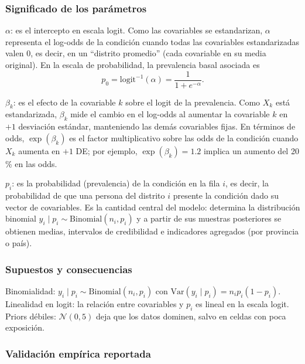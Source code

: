 \documentclass[
]{article}
\begin{document}
\subsubsection{Significado de los
parámetros}\label{significado-de-los-paruxe1metros}

\(\alpha\): es el intercepto en escala logit. Como las covariables se
estandarizan, \(\alpha\) representa el log-odds de la condición cuando
todas las covariables estandarizadas valen \(0\), es decir, en un
``distrito promedio'' (cada covariable en su media original). En la
escala de probabilidad, la prevalencia basal asociada es \[
p_0 = \mathrm{logit}^{-1}(\alpha) = \frac{1}{1 + e^{-\alpha}}.
\]

\(\beta_k\): es el efecto de la covariable \(k\) sobre el logit de la
prevalencia. Como \(X_k\) está estandarizada, \(\beta_k\) mide el cambio
en el log-odds al aumentar la covariable \(k\) en \(+1\) desviación
estándar, manteniendo las demás covariables fijas. En términos de odds,
\(\exp(\beta_k)\) es el factor multiplicativo sobre las odds de la
condición cuando \(X_k\) aumenta en \(+1\) DE; por ejemplo,
\(\exp(\beta_k)=1.2\) implica un aumento del 20 \% en las odds.

\(p_i\): es la probabilidad (prevalencia) de la condición en la fila
\(i\), es decir, la probabilidad de que una persona del distrito \(i\)
presente la condición dado su vector de covariables. Es la cantidad
central del modelo: determina la distribución binomial
\(y_i\mid p_i\sim\mathrm{Binomial}(n_i,p_i)\) y a partir de sus muestras
posteriores se obtienen medias, intervalos de credibilidad e indicadores
agregados (por provincia o país).

\subsubsection{Supuestos y
consecuencias}\label{supuestos-y-consecuencias}

Binomialidad: \(y_i\mid p_i \sim \mathrm{Binomial}(n_i,p_i)\) con
\(\mathrm{Var}(y_i\mid p_i)=n_i p_i(1-p_i)\).\\
Linealidad en logit: la relación entre covariables y \(p_i\) es lineal
en la escala logit.\\
Priors débiles: \(\mathcal N(0,5)\) deja que los datos dominen, salvo en
celdas con poca exposición.

\subsubsection{Validación empírica
reportada}\label{validaciuxf3n-empuxedrica-reportada}
\end{document}

